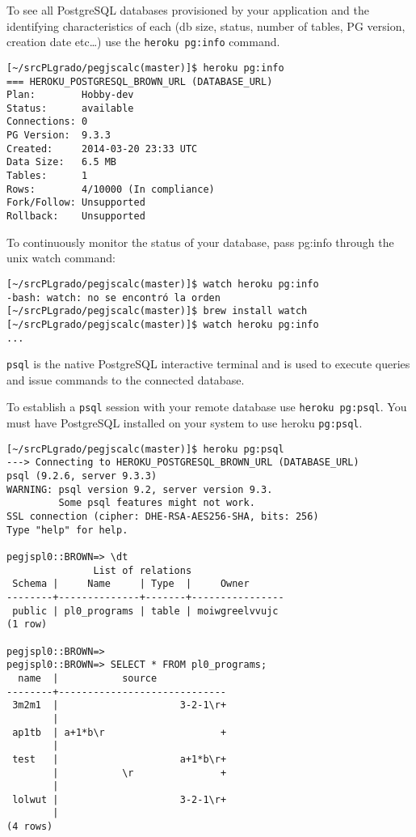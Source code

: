 
To see all PostgreSQL databases provisioned by your application and the
identifying characteristics of each 
(db size, status, number of tables, PG version, creation date etc…) 
use the \verb|heroku pg:info| command.

\begin{verbatim}
[~/srcPLgrado/pegjscalc(master)]$ heroku pg:info
=== HEROKU_POSTGRESQL_BROWN_URL (DATABASE_URL)
Plan:        Hobby-dev
Status:      available
Connections: 0
PG Version:  9.3.3
Created:     2014-03-20 23:33 UTC
Data Size:   6.5 MB
Tables:      1
Rows:        4/10000 (In compliance)
Fork/Follow: Unsupported
Rollback:    Unsupported
\end{verbatim}

To continuously monitor the status of your database, pass pg:info through the unix watch command:
\begin{verbatim}
[~/srcPLgrado/pegjscalc(master)]$ watch heroku pg:info
-bash: watch: no se encontró la orden
[~/srcPLgrado/pegjscalc(master)]$ brew install watch
[~/srcPLgrado/pegjscalc(master)]$ watch heroku pg:info
...
\end{verbatim}

\verb|psql| is the native PostgreSQL interactive terminal and is used to execute queries and issue commands to the connected database.

To establish a \verb|psql| session 
with your remote database use \verb|heroku pg:psql|.
You must have PostgreSQL installed on your system to use heroku \verb|pg:psql|.


\begin{verbatim}
[~/srcPLgrado/pegjscalc(master)]$ heroku pg:psql
---> Connecting to HEROKU_POSTGRESQL_BROWN_URL (DATABASE_URL)
psql (9.2.6, server 9.3.3)
WARNING: psql version 9.2, server version 9.3.
         Some psql features might not work.
SSL connection (cipher: DHE-RSA-AES256-SHA, bits: 256)
Type "help" for help.

pegjspl0::BROWN=> \dt
               List of relations
 Schema |     Name     | Type  |     Owner      
--------+--------------+-------+----------------
 public | pl0_programs | table | moiwgreelvvujc
(1 row)

pegjspl0::BROWN=> 
pegjspl0::BROWN=> SELECT * FROM pl0_programs;
  name  |           source            
--------+-----------------------------
 3m2m1  |                     3-2-1\r+
        |           
 ap1tb  | a+1*b\r                    +
        |           
 test   |                     a+1*b\r+
        |           \r               +
        |           
 lolwut |                     3-2-1\r+
        |           
(4 rows)
\end{verbatim}


